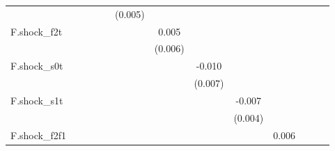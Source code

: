 {\begin{tabular}{l*{12}{c}}
            &                     &                     &                     &                     &     (0.005)         &                     &                     &                     &                     &                     &                     &                     \\
\addlinespace
F.shock\_f2t &                     &                     &                     &                     &                     &       0.005         &                     &                     &                     &                     &                     &                     \\
            &                     &                     &                     &                     &                     &     (0.006)         &                     &                     &                     &                     &                     &                     \\
\addlinespace
F.shock\_s0t &                     &                     &                     &                     &                     &                     &      -0.010         &                     &                     &                     &                     &                     \\
            &                     &                     &                     &                     &                     &                     &     (0.007)         &                     &                     &                     &                     &                     \\
\addlinespace
F.shock\_s1t &                     &                     &                     &                     &                     &                     &                     &      -0.007         &                     &                     &                     &                     \\
            &                     &                     &                     &                     &                     &                     &                     &     (0.004)         &                     &                     &                     &                     \\
\addlinespace
F.shock\_f2f1&                     &                     &                     &                     &                     &                     &                     &                     &       0.006         &                     &                     &                     \\

\end{tabular}}
